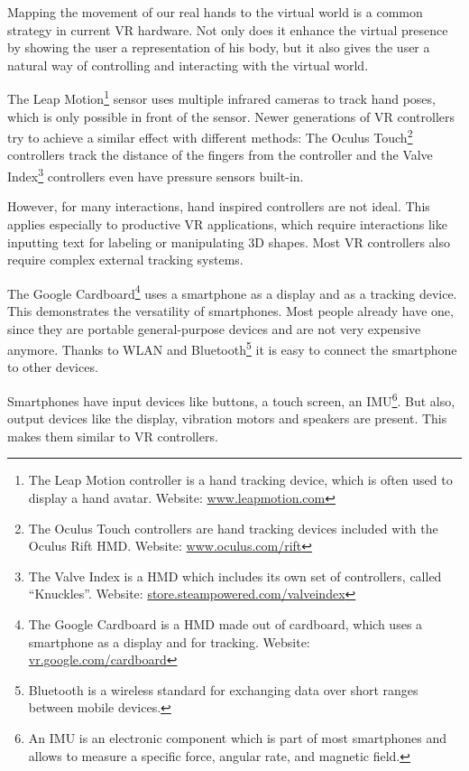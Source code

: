 Mapping the movement of our real hands to the virtual world is a common strategy in current \ac{VR} hardware. Not only does it enhance the virtual presence by showing the user a representation of his body, but it also gives the user a natural way of controlling and interacting with the virtual world. 

The Leap Motion\footnote{The Leap Motion controller is a hand tracking device, which is often used to display a hand avatar. Website: \href{https://www.leapmotion.com/}{www.leapmotion.com}} sensor uses multiple infrared cameras to track hand poses, which is only possible in front of the sensor. Newer generations of \ac{VR} controllers try to achieve a similar effect with different methods: The Oculus Touch\footnote{The Oculus Touch controllers are hand tracking devices included with the Oculus Rift \ac{HMD}. Website: \href{https://www.oculus.com/rift/}{www.oculus.com/rift}} controllers track the distance of the fingers from the controller and the Valve Index\footnote{The Valve Index is a \ac{HMD} which includes its own set of controllers, called \enquote{Knuckles}. Website: \href{https://store.steampowered.com/valveindex}{store.steampowered.com/valveindex}} controllers even have pressure sensors built-in.

However, for many interactions, hand inspired controllers are not ideal. This applies especially to productive \ac{VR} applications, which require interactions like inputting text for labeling or manipulating \ac{3D} shapes. Most \ac{VR} controllers also require complex external tracking systems. 

The Google Cardboard\footnote{The Google Cardboard is a \ac{HMD} made out of cardboard, which uses a smartphone as a display and for tracking. Website: \href{https://vr.google.com/cardboard/}{vr.google.com/cardboard}} uses a smartphone as a display and as a tracking device. This demonstrates the versatility of smartphones. Most people already have one, since they are portable general-purpose devices and are not very expensive anymore. Thanks to \ac{WLAN} and Bluetooth\footnote{Bluetooth is a wireless standard for exchanging data over short ranges between mobile devices.} it is easy to connect the smartphone to other devices. 

Smartphones have input devices like buttons, a touch screen, an \ac{IMU}\footnote{An IMU is an electronic component which is part of most smartphones and allows to measure a specific force, angular rate, and magnetic field.}. But also, output devices like the display, vibration motors and speakers are present. This makes them similar to \ac{VR} controllers. 

